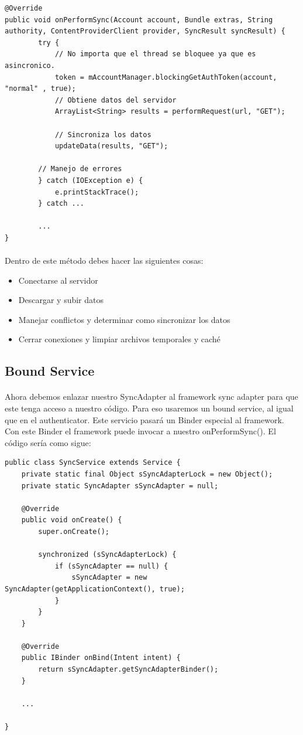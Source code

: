 \documentclass[10pt]{extarticle}
\begin{document}
\begin{lstlisting}
@Override
public void onPerformSync(Account account, Bundle extras, String authority, ContentProviderClient provider, SyncResult syncResult) {
        try {
            // No importa que el thread se bloquee ya que es asincronico.
            token = mAccountManager.blockingGetAuthToken(account, "normal" , true);			
			// Obtiene datos del servidor
            ArrayList<String> results = performRequest(url, "GET");

         	// Sincroniza los datos			
            updateData(results, "GET");
            
        // Manejo de errores
        } catch (IOException e) {
            e.printStackTrace();
        } catch ...
        
        ...
}
\end{lstlisting}

\paragraph{}
Dentro de este método debes hacer las siguientes cosas:
\begin{itemize}
	\item Conectarse al servidor
	\item Descargar y subir datos
	\item Manejar conflictos y determinar como sincronizar los datos
	\item Cerrar conexiones y limpiar archivos temporales y caché
\end{itemize}

\subsection{Bound Service}

\paragraph{}
Ahora debemos enlazar nuestro SyncAdapter al framework sync adapter para que este tenga acceso a nuestro código. Para eso usaremos un bound service, al igual que en el authenticator. Este servicio pasará un Binder especial al framework. Con este Binder el framework puede invocar a nuestro onPerformSync(). El código sería como sigue:

\begin{lstlisting}
public class SyncService extends Service {
    private static final Object sSyncAdapterLock = new Object();
    private static SyncAdapter sSyncAdapter = null;

    @Override
    public void onCreate() {
        super.onCreate();

        synchronized (sSyncAdapterLock) {
            if (sSyncAdapter == null) {
                sSyncAdapter = new SyncAdapter(getApplicationContext(), true);
            }
        }
    }
    
    @Override
    public IBinder onBind(Intent intent) {
        return sSyncAdapter.getSyncAdapterBinder();
    }
    
    ...

} 
\end{lstlisting}
\end{document}
